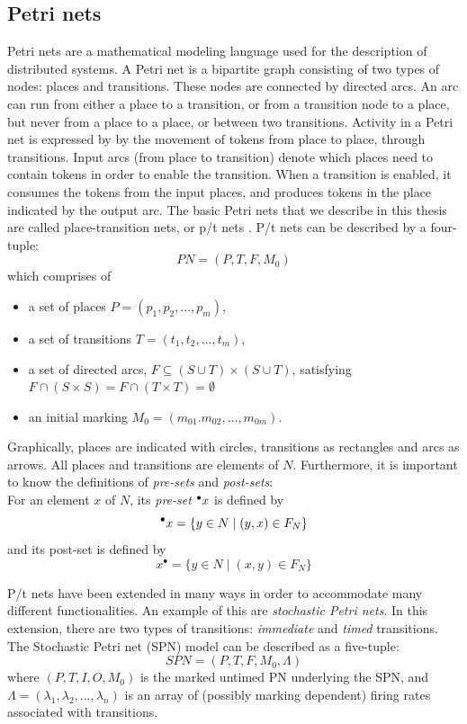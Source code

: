 \documentclass[11pt, a4paper]{book}
\begin{document}
\subsection{Petri nets}
\label{sec:petrinetsrelatedwork}
Petri nets are a mathematical modeling language used for the description of distributed systems. A Petri net is a bipartite graph consisting of two types of nodes: places and transitions. These nodes are connected by directed arcs. An arc can run from either a place to a transition, or from a transition node to a place, but never from a place to a place, or between two transitions. Activity in a Petri net is expressed by by the movement of tokens from place to place, through transitions. Input arcs (from place to transition) denote which places need to contain tokens in order to enable the transition. When a transition is enabled, it consumes the tokens from the input places, and produces tokens in the place indicated by the output arc. The basic Petri nets that we describe in this thesis are called place-transition nets, or p/t nets \cite{desel1998place}.
P/t nets can be described by a four-tuple:
\[
PN = (P,T,F,M_0)
\]
which comprises of
\begin{itemize}
\item a set of places $P = (p_1, p_2, ..., p_m)$,
\item a set of transitions $T = (t_1, t_2, ...,t_m)$,
\item a set of directed arcs, $F \subseteq (S \cup T) \times (S \cup T)$, satisfying $F \cap (S \times S) = F \cap (T \times T) = \emptyset$
\item an initial marking $M_0 = (m_{01}. m_{02}, \ldots, m_{0m})$.
\end{itemize}
Graphically, places are indicated with circles, transitions as rectangles and arcs as arrows.
All places and transitions are elements of $N$. Furthermore, it is important to know the definitions of \emph{pre-sets} and \emph{post-sets}:\\
For an element $x$ of $N$, its \emph{pre-set} $\prescript{\bullet}{}{x}$ is defined by
\[
\prescript{\bullet}{}{x} = \{y \in N \mid (y,x) \in F_N\}
\]
and its post-set is defined by
\[
x^{\bullet} = \{y \in N \mid (x,y) \in F_N\}
\]


P/t nets have been extended in many ways in order to accommodate many different functionalities. An example of this are \emph{stochastic Petri nets}. In this extension, there are two types of transitions: \emph{immediate} and \emph{timed} transitions.
The Stochastic Petri net (SPN) model can be described as a five-tuple:
\begin{equation}
SPN = (P,T,F,M_0,\Lambda)
\end{equation}
where $(P,T,I,O,M_0)$ is the marked untimed PN underlying the SPN, and $\Lambda = (\lambda_1, \lambda_2, \ldots, \lambda_n)$ is an array of (possibly marking dependent) firing rates associated with transitions.
\end{document}
